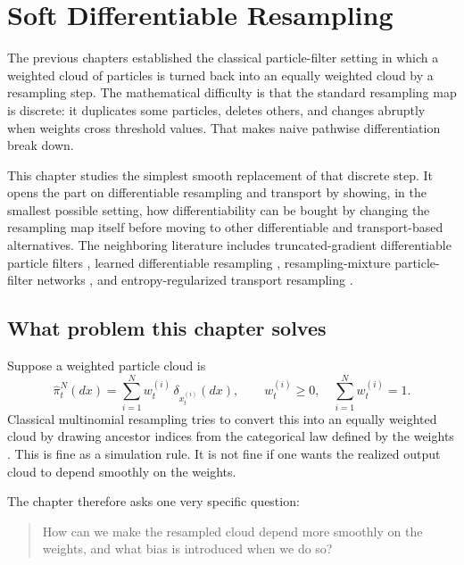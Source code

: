\chapter{Soft Differentiable Resampling}
\label{ch:bf-dpf-soft-resampling}

The previous chapters established the classical particle-filter setting in which a
weighted cloud of particles is turned back into an equally weighted cloud by a
resampling step.  The mathematical difficulty is that the standard resampling map
is discrete: it duplicates some particles, deletes others, and changes abruptly
when weights cross threshold values.  That makes naive pathwise differentiation
break down.

This chapter studies the simplest smooth replacement of that discrete step.  It
opens the part on differentiable resampling and transport by showing, in the
smallest possible setting, how differentiability can be bought by changing the
resampling map itself before moving to other differentiable and
transport-based alternatives.  The neighboring literature includes
truncated-gradient differentiable particle filters
\citep{jonschkowski2018differentiable}, learned differentiable resampling
\citep{zhumurphyjonschkowski2020}, resampling-mixture particle-filter networks
\citep{karkus2018particle}, and entropy-regularized transport resampling
\citep{corenflos2021differentiable}.

\section{What problem this chapter solves}
\label{sec:bf-soft-what-problem}

Suppose a weighted particle cloud is
\begin{equation}
\label{eq:bf-soft-weighted-cloud}
  \hat\pi_t^N(dx)
  =
  \sum_{i=1}^N w_t^{(i)}\,\delta_{x_t^{(i)}}(dx),
  \qquad
  w_t^{(i)}\ge 0,
  \quad
  \sum_{i=1}^N w_t^{(i)}=1.
\end{equation}
Classical multinomial resampling tries to convert this into an equally weighted
cloud by drawing ancestor indices from the categorical law defined by the weights
\citep{doucet2001sequential,chopin2020introduction}.
This is fine as a simulation rule.  It is not fine if one wants the realized
output cloud to depend smoothly on the weights.

The chapter therefore asks one very specific question:
\begin{quote}
How can we make the resampled cloud depend more smoothly on the weights, and what
bias is introduced when we do so?
\end{quote}

